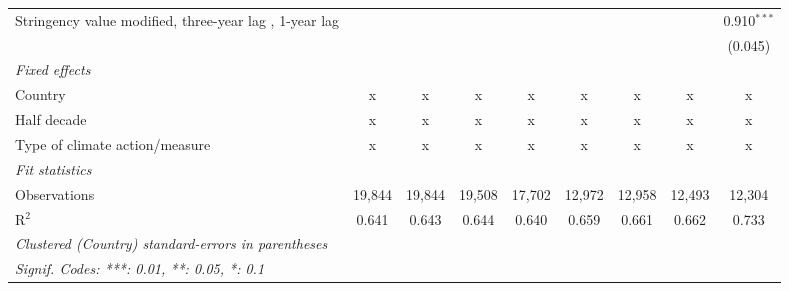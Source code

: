 \begin{table}[htbp]
\begin{tabular}{lcccccccc}
      Stringency value modified, three-year lag , 1-year lag                            &               &              &              &              &               &               &               & 0.910$^{***}$\\   
                                                                                        &               &              &              &              &               &               &               & (0.045)\\   
      \emph{Fixed effects}\\
      Country                                                                           & x             & x            & x            & x            & x             & x             & x             & x\\  
      Half decade                                                                       & x             & x            & x            & x            & x             & x             & x             & x\\  
      Type of climate action/measure                                                    & x             & x            & x            & x            & x             & x             & x             & x\\  
      \midrule \emph{Fit statistics}\\
      Observations                                                                      & 19,844        & 19,844       & 19,508       & 17,702       & 12,972        & 12,958        & 12,493        & 12,304\\  
      R$^2$                                                                             & 0.641         & 0.643        & 0.644        & 0.640        & 0.659         & 0.661         & 0.662         & 0.733\\  
      \midrule
      \multicolumn{9}{l}{\emph{Clustered (Country) standard-errors in parentheses}}\\
      \multicolumn{9}{l}{\emph{Signif. Codes: ***: 0.01, **: 0.05, *: 0.1}}\\
   \end{tabular}
\end{table}



